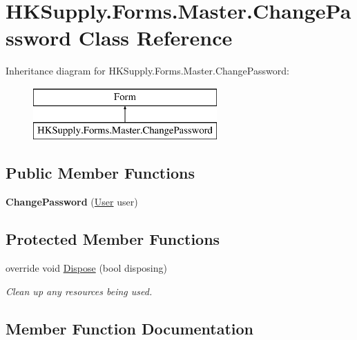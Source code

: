 \hypertarget{class_h_k_supply_1_1_forms_1_1_master_1_1_change_password}{}\section{H\+K\+Supply.\+Forms.\+Master.\+Change\+Password Class Reference}
\label{class_h_k_supply_1_1_forms_1_1_master_1_1_change_password}
Inheritance diagram for H\+K\+Supply.\+Forms.\+Master.\+Change\+Password\+:\begin{figure}[H]
\begin{center}
\leavevmode
\includegraphics[height=2.000000cm]{class_h_k_supply_1_1_forms_1_1_master_1_1_change_password}
\end{center}
\end{figure}
\subsection*{Public Member Functions}
\begin{DoxyCompactItemize}
\item 
\mbox{\label{class_h_k_supply_1_1_forms_1_1_master_1_1_change_password_aede98523b7abd2b8e57d2f7eb1f58154}} 
{\bfseries Change\+Password} (\hyperlink{class_h_k_supply_1_1_models_1_1_user}{User} user)
\end{DoxyCompactItemize}
\subsection*{Protected Member Functions}
\begin{DoxyCompactItemize}
\item 
override void \hyperlink{class_h_k_supply_1_1_forms_1_1_master_1_1_change_password_a4370e4e0a208baadce764ed1081fb017}{Dispose} (bool disposing)
\begin{DoxyCompactList}\small\item\em Clean up any resources being used. \end{DoxyCompactList}\end{DoxyCompactItemize}


\subsection{Member Function Documentation}
\mbox{\label{class_h_k_supply_1_1_forms_1_1_master_1_1_change_password_a4370e4e0a208baadce764ed1081fb017}} 
